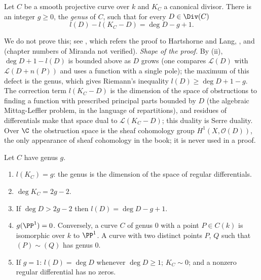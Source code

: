 \begin{theorem}\label{thm:curves:riemann-roch}
Let $C$ be a smooth projective curve over $k$ and $K_C$ a canonical divisor. There is an integer $g\ge0$, the \emph{genus} of $C$, such that for every
$D\in\Div(C)$
\[
l(D)-l(K_C-D)=\deg D-g+1.
\]
\end{theorem}

We do not prove this; see \cite[Chapter II, Theorem 5.4]{SilvermanAEC}, which refers the proof to Hartshorne and Lang,
\cite[Chapter IV, Theorem 1.3]{Hartshorne}, \cite[Chapter 8]{Fulton} and \cite[Chapter VI]{Miranda} (chapter numbers of Miranda not verified).
\emph{Shape of the proof.} By (ii), $\deg D+1-l(D)$ is bounded above as $D$ grows (one compares $\mathcal L(D)$ with
$\mathcal L(D+n(P))$ and uses a function with a single pole); the maximum of this defect is the genus, which gives Riemann's inequality
$l(D)\ge\deg D+1-g$. The correction term $l(K_C-D)$ is the dimension of the space of obstructions to finding a function with prescribed principal parts
bounded by $D$ (the algebraic Mittag-Leffler problem, in the language of repartitions), and residues of differentials make that space dual to
$\mathcal L(K_C-D)$; this duality is Serre duality. Over $\C$ the obstruction space is the sheaf cohomology group $H^1(X,\mathcal O(D))$, the only appearance
of sheaf cohomology in the book; it is never used in a proof.

\begin{corollary}\label{cor:curves:rr-consequences}
Let $C$ have genus $g$.
\begin{enumerate}[label=(\alph*)]
\item $l(K_C)=g$: the genus is the dimension of the space of regular differentials.
\item $\deg K_C=2g-2$.
\item If $\deg D>2g-2$ then $l(D)=\deg D-g+1$.
\item $g(\PP^1)=0$. Conversely, a curve $C$ of genus $0$ with a point $P\in C(k)$ is isomorphic over $k$ to $\PP^1$. A curve with two distinct points $P$, $Q$
such that $(P)\sim(Q)$ has genus $0$.
\item If $g=1$: $l(D)=\deg D$ whenever $\deg D\ge1$; $K_C\sim0$; and a nonzero regular differential has no zeros.
\end{enumerate}
\end{corollary}

